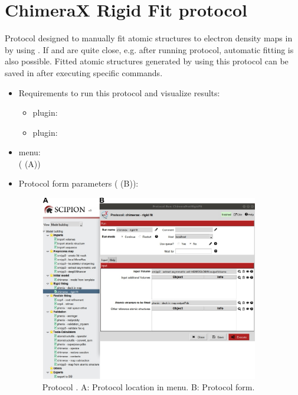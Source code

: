 \section{ChimeraX Rigid Fit protocol}
\label{app:chimeraRigidFit}%
Protocol designed to manually fit atomic structures to electron density maps in \scipion by using \chimera. If  and  are quite close, e.g. after running \phenix {} protocol, automatic fitting is also possible. Fitted atomic structures generated by using this protocol can be saved in \scipion after executing specific \chimera commands.
   
 \begin{itemize}
  \item Requirements to run this protocol and visualize results:
    \begin{itemize}
    \item \scipion plugin: 
        \item \scipion plugin: 
    \end{itemize}
  \item \scipion menu:\\
    ( (A))
  
  \item Protocol form parameters ( (B)):
  
    \begin{figure}[H]
     \centering 
     \captionsetup{width=.7\linewidth} 
     \includegraphics[width=0.90\textwidth]{Images_appendix/Fig116.pdf}
     \caption{Protocol . A: Protocol location in \scipion menu. B: Protocol form.}
     \label{fig:app_protocol_chimera_1}
    \end{figure}
    

\end{itemize}
